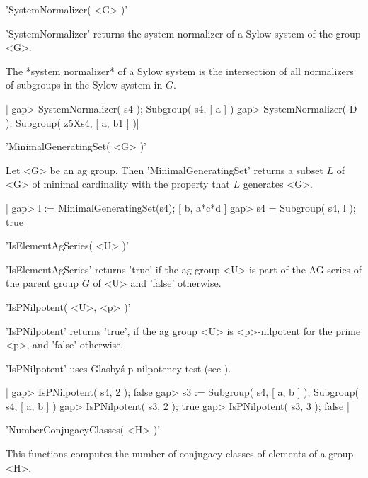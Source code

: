 
'SystemNormalizer( <G> )'

'SystemNormalizer' returns the system normalizer of a Sylow system of the
group <G>.

The *system  normalizer* of a  Sylow system  is the intersection  of  all
normalizers of subgroups in the Sylow system in $G$.

|    gap> SystemNormalizer( s4 );
    Subgroup( s4, [ a ] )
    gap> SystemNormalizer( D );
    Subgroup( z5Xs4, [ a, b1 ] )|


'MinimalGeneratingSet( <G> )'

Let <G> be an ag group.   Then 'MinimalGeneratingSet' returns a subset
$L$ of <G> of minimal cardinality with the property that $L$ generates
<G>.

|    gap> l := MinimalGeneratingSet(s4);
    [ b, a*c*d ]
    gap> s4 = Subgroup( s4, l );
    true |


'IsElementAgSeries( <U> )'

'IsElementAgSeries' returns  'true' if  the ag  group <U> is part  of the
AG series of the parent group $G$ of <U> and 'false' otherwise.


'IsPNilpotent( <U>, <p> )'

'IsPNilpotent' returns 'true', if the  ag group  <U> is <p>-nilpotent for
the prime <p>, and 'false' otherwise.

'IsPNilpotent' uses Glasby\'s p-nilpotency test (see \cite{Gla87}).

|    gap> IsPNilpotent( s4, 2 );
    false
    gap> s3 := Subgroup( s4, [ a, b ] );
    Subgroup( s4, [ a, b ] )
    gap> IsPNilpotent( s3, 2 );
    true
    gap> IsPNilpotent( s3, 3 );
    false |


'NumberConjugacyClasses( <H> )'

This functions  computes the number of conjugacy classes of elements of a
group <H>.

